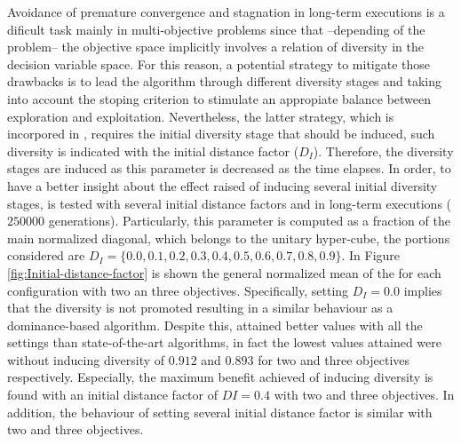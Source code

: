 Avoidance of premature convergence and stagnation in long-term executions is a dificult task mainly in multi-objective problems since that --depending of the problem-- the objective space implicitly involves a relation of diversity in the decision variable space.
%
For this reason, a potential strategy to mitigate those drawbacks is to lead the algorithm through different diversity stages and taking into account the stoping criterion to stimulate an appropiate balance between exploration and exploitation.
%
Nevertheless, the latter strategy, which is incorpored in \VSDMOEA{}, requires the initial diversity stage that should be induced, such diversity is indicated with the initial distance factor ($D_I$).
%
Therefore, the diversity stages are induced as this parameter is decreased as the time elapses.
%
In order, to have a better insight about the effect raised of inducing several initial diversity stages, \VSDMOEA{} is tested with several initial distance factors and in long-term executions ($250000$ generations).
%
Particularly, this parameter is computed as a fraction of the main normalized diagonal, which belongs to the unitary hyper-cube, the portions considered are $D_I = \{0.0, 0.1, 0.2, 0.3, 0.4, 0.5, 0.6, 0.7, 0.8, 0.9\}$.
%
In Figure \ref{fig:Initial-distance-factor} is shown the general normalized mean of the \HV{} for each configuration with two an three objectives.
%
Specifically, setting $D_I=0.0$ implies that the diversity is not promoted resulting in a similar behaviour as a dominance-based algorithm.
%
Despite this, \VSDMOEA{} attained better \HV{} values with all the settings than state-of-the-art algorithms, in fact the lowest values attained were without inducing diversity of $0.912$ and $0.893$ for two and three objectives respectively.
%
Especially, the maximum benefit achieved of inducing diversity is found with an initial distance factor of $DI=0.4$ with two and three objectives.
%
In addition, the behaviour of setting several initial distance factor is similar with two and three objectives.
%



